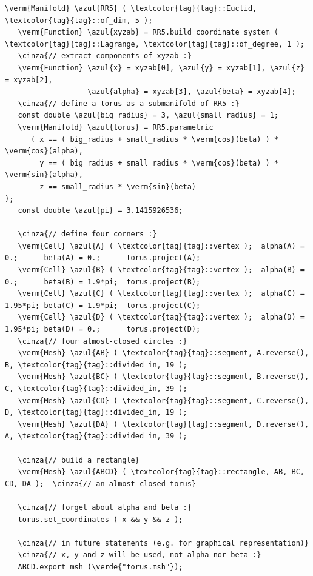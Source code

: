 \begin{Verbatim}[commandchars=\\\{\},formatcom=\small\tt,frame=single,
   label=parag-\ref{\numb section 2.\numb parag 17}.cpp,rulecolor=\color{coment},
   baselinestretch=0.94,framesep=2mm]
   \verm{Manifold} \azul{RR5} ( \textcolor{tag}{tag}::Euclid, \textcolor{tag}{tag}::of_dim, 5 );
   \verm{Function} \azul{xyzab} = RR5.build_coordinate_system ( \textcolor{tag}{tag}::Lagrange, \textcolor{tag}{tag}::of_degree, 1 );
   \cinza{// extract components of xyzab :}
   \verm{Function} \azul{x} = xyzab[0], \azul{y} = xyzab[1], \azul{z} = xyzab[2],
                   \azul{alpha} = xyzab[3], \azul{beta} = xyzab[4];
   \cinza{// define a torus as a submanifold of RR5 :}
   const double \azul{big_radius} = 3, \azul{small_radius} = 1;
   \verm{Manifold} \azul{torus} = RR5.parametric
      ( x == ( big_radius + small_radius * \verm{cos}(beta) ) * \verm{cos}(alpha),
        y == ( big_radius + small_radius * \verm{cos}(beta) ) * \verm{sin}(alpha),
        z == small_radius * \verm{sin}(beta)                                );
   const double \azul{pi} = 3.1415926536;
        
   \cinza{// define four corners :}
   \verm{Cell} \azul{A} ( \textcolor{tag}{tag}::vertex );  alpha(A) = 0.;      beta(A) = 0.;      torus.project(A);
   \verm{Cell} \azul{B} ( \textcolor{tag}{tag}::vertex );  alpha(B) = 0.;      beta(B) = 1.9*pi;  torus.project(B);
   \verm{Cell} \azul{C} ( \textcolor{tag}{tag}::vertex );  alpha(C) = 1.95*pi; beta(C) = 1.9*pi;  torus.project(C);
   \verm{Cell} \azul{D} ( \textcolor{tag}{tag}::vertex );  alpha(D) = 1.95*pi; beta(D) = 0.;      torus.project(D);
   \cinza{// four almost-closed circles :}
   \verm{Mesh} \azul{AB} ( \textcolor{tag}{tag}::segment, A.reverse(), B, \textcolor{tag}{tag}::divided_in, 19 );
   \verm{Mesh} \azul{BC} ( \textcolor{tag}{tag}::segment, B.reverse(), C, \textcolor{tag}{tag}::divided_in, 39 );
   \verm{Mesh} \azul{CD} ( \textcolor{tag}{tag}::segment, C.reverse(), D, \textcolor{tag}{tag}::divided_in, 19 );
   \verm{Mesh} \azul{DA} ( \textcolor{tag}{tag}::segment, D.reverse(), A, \textcolor{tag}{tag}::divided_in, 39 );

   \cinza{// build a rectangle}
   \verm{Mesh} \azul{ABCD} ( \textcolor{tag}{tag}::rectangle, AB, BC, CD, DA );  \cinza{// an almost-closed torus}

   \cinza{// forget about alpha and beta :}
   torus.set_coordinates ( x && y && z );

   \cinza{// in future statements (e.g. for graphical representation)}
   \cinza{// x, y and z will be used, not alpha nor beta :}
   ABCD.export_msh (\verde{"torus.msh"});
\end{Verbatim}

